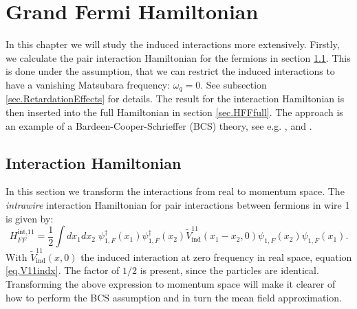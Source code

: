 
\chapter{Grand Fermi Hamiltonian} %

\label{Chapter4} %


In this chapter we will study the induced interactions more extensively. Firstly, we calculate the pair interaction Hamiltonian for the fermions in section \ref{sec.HFFint}. This is done under the assumption, that we can restrict the induced interactions to have a vanishing Matsubara frequency: $\omega_q = 0$. See subsection \ref{sec.RetardationEffects} for details. The result for the interaction Hamiltonian is then inserted into the full Hamiltonian in section \ref{sec.HFFfull}. The approach is an example of a Bardeen-Cooper-Schrieffer (BCS) theory, see e.g. \cite[chapter 3]{Tinkham}, \cite[pp. 153-163]{LandauStatPhys2} and \cite[pp. 359-369]{PlischkeStatPhys}. 

\section{Interaction Hamiltonian} \label{sec.HFFint}
In this section we transform the interactions from real to momentum space. The \textit{intrawire} interaction Hamiltonian for pair interactions between fermions in wire 1 is given by:
\begin{equation}
H^\text{int,11}_{FF} = \frac{1}{2}\int dx_1dx_2\; \psi^\dagger_{1,F}(x_1)\psi^\dagger_{1,F}(x_2)\tilde{V}^{11}_{\text{ind}}(x_1 - x_2, 0) \psi_{1,F}(x_2) \psi_{1,F}(x_1).
\label{eq.HFF11intdef}
\end{equation}
With $\tilde{V}^{11}_\text{ind}(x,0)$ the induced interaction at zero frequency in real space, equation \eqref{eq.V11indx}. The factor of $1/2$ is present, since the particles are identical. Transforming the above expression to momentum space will make it clearer of how to perform the BCS assumption and in turn the mean field approximation. 

